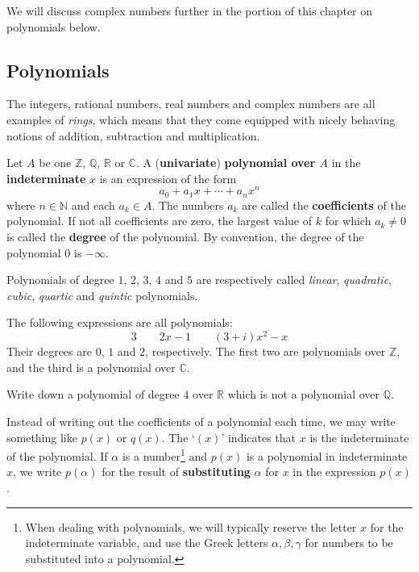 We will discuss complex numbers further in the portion of this chapter on polynomials below.

\subsection*{Polynomials}
\label{pGettingStartedPolynomials}

The integers, rational numbers, real numbers and complex numbers are all examples of \textit{rings}, which means that they come equipped with nicely behaving notions of addition, subtraction and multiplication.

\begin{definition}
\label{defPolynomialPreliminary}
Let $A$ be one $\mathbb{Z}$, $\mathbb{Q}$, $\mathbb{R}$ or $\mathbb{C}$. A (\textbf{univariate}) \textbf{polynomial over $A$} in the \textbf{indeterminate} $x$ is an expression of the form
\[ a_0 + a_1x + \cdots + a_nx^n \]
where $n \in \mathbb{N}$ and each $a_k \in A$. The numbers $a_k$ are called the \textbf{coefficients} of the polynomial. If not all coefficients are zero, the largest value of $k$ for which $a_k \ne 0$ is called the \textbf{degree} of the polynomial. By convention, the degree of the polynomial $0$ is $-\infty$.
\end{definition}

Polynomials of degree $1$, $2$, $3$, $4$ and $5$ are respectively called \textit{linear}, \textit{quadratic}, \textit{cubic}, \textit{quartic} and \textit{quintic} polynomials.

\begin{example}
The following expressions are all polynomials:
\[ 3 \qquad 2x-1 \qquad (3+i)x^2-x \]
Their degrees are $0$, $1$ and $2$, respectively. The first two are polynomials over $\mathbb{Z}$, and the third is a polynomial over $\mathbb{C}$.
\end{example}

\begin{exercise}
Write down a polynomial of degree $4$ over $\mathbb{R}$ which is not a polynomial over $\mathbb{Q}$.
\end{exercise}

\begin{notation}
Instead of writing out the coefficients of a polynomial each time, we may write something like $p(x)$ or $q(x)$. The `$(x)$' indicates that $x$ is the indeterminate of the polynomial. If $\alpha$ is a number\footnote{When dealing with polynomials, we will typically reserve the letter $x$ for the indeterminate variable, and use the Greek letters $\alpha,\beta,\gamma$  for numbers to be substituted into a polynomial.} and $p(x)$ is a polynomial in indeterminate $x$, we write $p(\alpha)$ for the result of \textbf{substituting} $\alpha$ for $x$ in the expression $p(x)$.
\end{notation}

